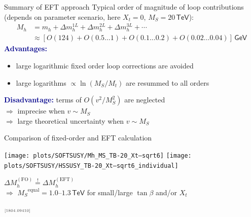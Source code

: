 \documentclass[hyperref={pdfpagelabels=false},ngerman]{beamer}
\newcommand{\eh}[1]{\,\mathsf{#1}}
\newcommand{\MS}{\ensuremath{M_S}}
\newcommand{\mycite}[1]{\ensuremath{\text{\textcolor{darkgray}{\tiny [#1]}}}}
\renewcommand{\emph}[1]{\textbf{\textcolor{darkblue}{#1}}}
\newcommand{\TeV}{\eh{TeV}}
\newcommand{\DMh}{\ensuremath{\Delta M_h^{(\text{FO})}}}
\newcommand{\DMhHSSUSY}{\ensuremath{\Delta M_h^{(\text{EFT})}}}
\begin{document}
\begin{frame}{Summary of EFT approach}
  Typical order of magnitude of loop contributions (depends on
  parameter scenario, here $X_t = 0$, $\MS = 20\eh{TeV}$):
  \begin{align*}
    M_h &= m_h + \Delta m_h^{1L} + \Delta m_h^{2L} + \Delta m_h^{3L} + \cdots \\
    &\approx [O(124) + O(0.5\ldots 1) + O(0.1\ldots 0.2) + O(0.02\ldots 0.04)] \eh{GeV}
  \end{align*}
  \emph{Advantages:}
  \begin{itemize}
  \item large logarithmic fixed order loop corrections are avoided
  \item large logarithms $\propto\ln(M_S/M_t)$ are resummed to all orders
  \end{itemize}
  \emph{Disadvantage:} terms of $O(v^2/M_S^2)$ are neglected \\
  $\Rightarrow$ imprecise when $v \sim \MS$ \\
  $\Rightarrow$ large theoretical uncertainty when $v \sim \MS$
\end{frame}

\begin{frame}{Comparison of fixed-order and EFT calculation}
  \begin{center}
    \texttt{[image: plots/SOFTSUSY/Mh\_MS\_TB-20\_Xt--sqrt6]}\hfill
    \texttt{[image: plots/SOFTSUSY/HSSUSY\_TB-20\_Xt--sqrt6\_individual]}
  \end{center}
  \begin{center}
    $\DMh \overset{!}{=} \DMhHSSUSY$\\[0.5em]
    $\Rightarrow$ $\MS^{\text{equal}} = 1.0$--$1.3\TeV$ for
    small/large $\tan\beta$ and/or $X_t$
  \end{center}
  \mycite{1804.09410}
\end{frame}
\end{document}
